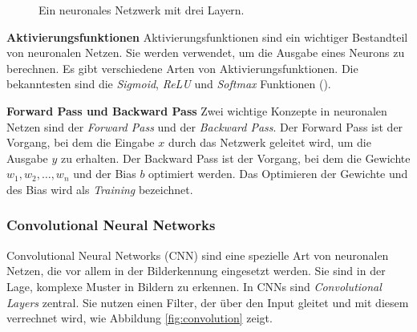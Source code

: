 \documentclass[11pt,a4paper]{article}
\begin{document}
\begin{figure}[h!]
	\centering
	\caption{Ein neuronales Netzwerk mit drei Layern.}
	\label{fig:neural_network}
\end{figure}




\noindent \newline \textbf{Aktivierungsfunktionen} \newline
Aktivierungsfunktionen sind ein wichtiger Bestandteil von neuronalen Netzen. Sie werden verwendet,
um die Ausgabe eines Neurons zu berechnen. Es gibt verschiedene Arten von Aktivierungsfunktionen.
Die bekanntesten sind die \textit{Sigmoid}, \textit{ReLU} und \textit{Softmax} Funktionen 
(\cite{weidman2019deep}).


\noindent \newline \textbf{Forward Pass und Backward Pass} \newline
Zwei wichtige Konzepte in neuronalen Netzen sind der \textit{Forward Pass} und der
\textit{Backward Pass}. Der Forward Pass ist der Vorgang, bei dem die Eingabe \(x\) durch das
Netzwerk geleitet wird, um die Ausgabe \(y\) zu erhalten. Der Backward Pass ist der Vorgang, bei
dem die Gewichte \(w_{1}, w_{2}, \dots, w_{n}\) und der Bias \(b\) optimiert werden. Das Optimieren
der Gewichte und des Bias wird als \textit{Training} bezeichnet. 

\subsubsection{Convolutional Neural Networks}
Convolutional Neural Networks (CNN) sind eine spezielle Art von neuronalen Netzen, die vor allem
in der Bilderkennung eingesetzt werden. Sie sind in der Lage, komplexe Muster in Bildern zu 
erkennen. In CNNs sind \textit{Convolutional Layers} zentral. Sie nutzen einen Filter, der über den 
Input gleitet und mit diesem verrechnet wird, wie Abbildung \ref{fig:convolution} zeigt.
\end{document}
